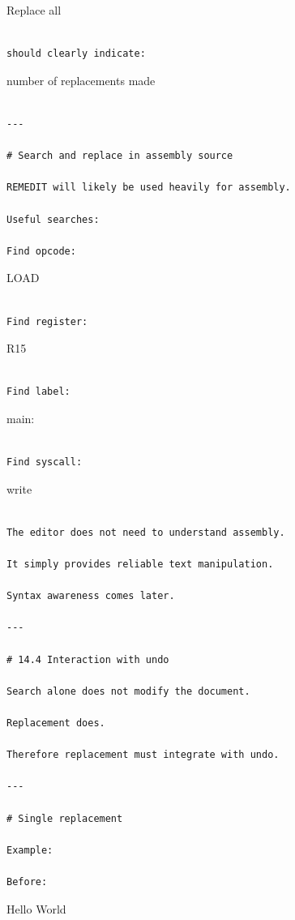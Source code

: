 \documentclass[
  oneside,
  openany]{book}
\begin{document}
Replace all

\begin{verbatim}

should clearly indicate:
\end{verbatim}

number of replacements made

\begin{verbatim}

---

# Search and replace in assembly source

REMEDIT will likely be used heavily for assembly.

Useful searches:

Find opcode:
\end{verbatim}

LOAD

\begin{verbatim}

Find register:
\end{verbatim}

R15

\begin{verbatim}

Find label:
\end{verbatim}

main:

\begin{verbatim}

Find syscall:
\end{verbatim}

write

\begin{verbatim}

The editor does not need to understand assembly.

It simply provides reliable text manipulation.

Syntax awareness comes later.

---

# 14.4 Interaction with undo

Search alone does not modify the document.

Replacement does.

Therefore replacement must integrate with undo.

---

# Single replacement

Example:

Before:
\end{verbatim}

Hello World
\end{document}

